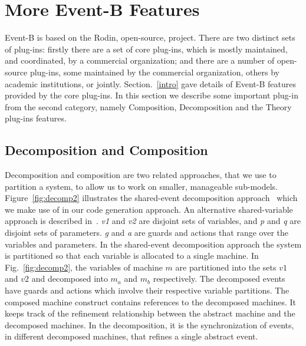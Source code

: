 \section{More Event-B Features}\label{features}
Event-B is based on the Rodin, open-source, project. There are two distinct sets of plug-ins: firstly there are a set of core plug-ins, which is mostly maintained, and coordinated, by a commercial organization; and there are a number of open-source plug-ins, some maintained by the commercial organization, others by academic institutions, or jointly. Section.~\ref{intro} gave details of Event-B features provided by the core plug-ins. In this section we describe some important plug-in from the second category, namely Composition, Decomposition and the Theory plug-ins features. 
\subsection{Decomposition and Composition}

Decomposition and composition are two related approaches, that we use to partition a system, to allow us to work on smaller, manageable sub-models. Figure~\ref{fig:decomp2} illustrates the shared-event decomposition approach~\cite{decomp2010c} which we make use of in our code generation approach. An alternative shared-variable approach is described in~\cite{AbrialH07}. \emph{v1} and \emph{v2} are disjoint sets of variables, and \emph{p} and \emph{q} are disjoint sets of parameters. \emph{g} and \emph{a} are guards and actions that range over the  variables and parameters. In the shared-event decomposition approach the system is partitioned so that each variable is allocated to a single machine. In Fig.~\ref{fig:decomp2}, the variables of machine $m$ are partitioned into the sets $v1$ and $v2$ and decomposed into $m_a$ and $m_b$ respectively. The decomposed events have guards and actions which involve their respective variable partitions. The composed machine construct contains references to the decomposed machines. It keeps track of the refinement relationship between the abstract machine and the decomposed machines. In the decomposition, it is the synchronization of events, in different decomposed machines, that refines a single abstract event. 

